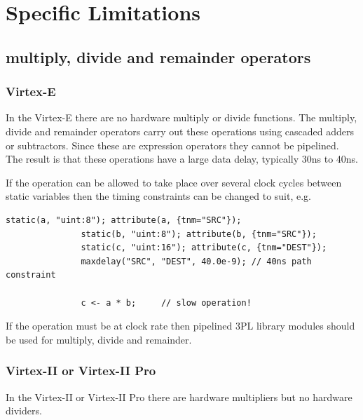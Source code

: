 \pagebreak

\chapter{Specific Limitations}

    \section{multiply, divide and remainder operators}
    
        \subsection{Virtex-E}

            In the Virtex-E there are no hardware multiply or
            divide functions. The multiply, divide and remainder operators
            carry out these operations using cascaded adders or subtractors.
            Since these are expression operators they cannot be pipelined. The
            result is that these operations have a large data delay, typically
            30ns to 40ns.
            
            If the operation can be allowed to take place over several
            clock cycles between static variables then the timing constraints
            can be changed to suit, e.g.
            \begin{lstlisting}[gobble=12, language=threepl]
               static(a, "uint:8"); attribute(a, {tnm="SRC"});
               static(b, "uint:8"); attribute(b, {tnm="SRC"});
               static(c, "uint:16"); attribute(c, {tnm="DEST"});
               maxdelay("SRC", "DEST", 40.0e-9); // 40ns path constraint

               c <- a * b;     // slow operation!
            \end{lstlisting}
            
            If the operation must be at clock rate then pipelined 3PL library
            modules should be used for multiply, divide and remainder.
    
        \subsection{Virtex-II or Virtex-II Pro}

            In the Virtex-II or Virtex-II Pro there are hardware multipliers
            but no hardware dividers.

